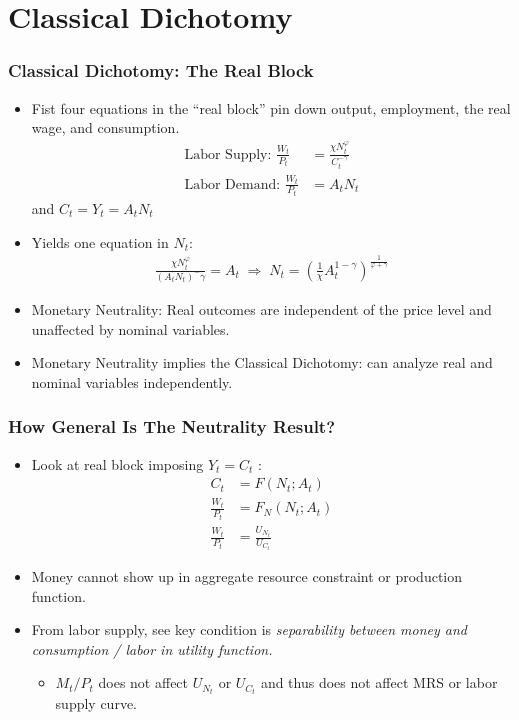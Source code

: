 \documentclass[english,xcolor=svgnames]{beamer}
\begin{document}
\section{Classical Dichotomy}

\begin{frame}
\frametitle{Classical Dichotomy: The Real Block
}
\begin{itemize}
	\item Fist four equations in the ``real block'' pin down output, employment, the real wage, and consumption.
	\begin{align*}
		\text{Labor Supply: }\frac{W_t}{P_t}&=\frac{\chi N_t^\varphi}{C_t^{-\gamma}}\\
		\text{Labor Demand: }\frac{W_t}{P_t}&= A_tN_{t} 
	\end{align*}
	and $C_t=Y_t=A_tN_t $
	\item Yields one equation in $N_t$:
	\begin{align*}
		\frac{\chi N_t^\varphi}{(A_tN_t )^-\gamma}= A_t \;\Rightarrow\;N_t=\left(\frac{1}{\chi}A_{t}^{1-\gamma}\right)^{\frac{1}{\varphi+\gamma }}
	\end{align*}
	\item Monetary Neutrality: Real outcomes are independent of the price level and unaffected by nominal variables.
	\item Monetary Neutrality implies the Classical Dichotomy: can analyze real and nominal variables independently.
\end{itemize}
\end{frame}




\begin{frame}
\frametitle{How General Is The Neutrality Result?
}
\begin{itemize}
	\item Look at real block imposing $Y_t=C_t$ :
	\begin{align*}
	C_t&=F(N_t;A_t) \\
	\frac{W_t}{P_t}&=F_N(N_t;A_t) \\
	\frac{W_t}{P_t}&=\frac{U_{N_t}}{U_{C_t}} 
\end{align*}
	\item Money cannot show up in aggregate resource constraint or
production function.
	\item From labor supply, see key condition is \emph{separability between
money and consumption / labor in utility function.}
	\begin{itemize}
		\item $M_t/P_t$ does not affect $U_{N_t}$ or $U_{C_t}$ and thus does not affect MRS or labor supply curve.
	\end{itemize}
\end{itemize}
\end{frame}
\end{document}
